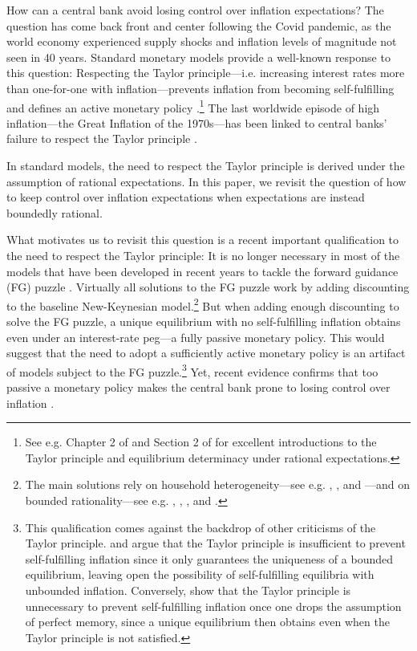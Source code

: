 \documentclass{article}
\begin{document}
How can a central bank avoid losing control over inflation expectations? The question has come back front and center following the Covid pandemic, as the world economy experienced supply shocks and inflation levels of magnitude not seen in 40 years. Standard monetary models provide a well-known response to this question: Respecting the Taylor principle---i.e. increasing interest rates more than one-for-one with inflation---prevents inflation from becoming self-fulfilling and defines an active monetary policy \citep[e.g.][]{Woodford2001}.\footnote{See e.g. Chapter 2 of \cite{Woodford} and Section 2 of \cite{CastilloMartinezReis2022} for excellent introductions to the Taylor principle and equilibrium determinacy under rational expectations.} The last worldwide episode of high inflation---the Great Inflation of the 1970s---has been linked to central banks' failure to respect the Taylor principle \citep{Taylor1999,CGG2000}.

In standard models, the need to respect the Taylor principle is derived under the assumption of rational expectations. In this paper, we revisit the question of how to keep control over inflation expectations when expectations are instead boundedly rational.

What motivates us to revisit this question is a recent important qualification to the need to respect the Taylor principle: It is no longer necessary in most of the models that have been developed in recent years to tackle the forward guidance (FG) puzzle \citep{DNGP2012,CFP2015}. Virtually all solutions to the FG puzzle work by adding discounting to the baseline New-Keynesian model.\footnote{The main solutions rely on household heterogeneity---see e.g. \cite{MKNS2016}, \cite{Bilbiie2020,Bilbiie2021}, \cite{Werning2015} and \cite{AcharyaDogra2020}---and on bounded rationality---see e.g. \cite{Woodford2019}, \cite{FarhiWerning2019}, \cite{Gabaix2020}, \cite{AngeletosLian2018} and \cite{FPHIFLAP}.} But when adding enough discounting to solve the FG puzzle, a unique equilibrium with no self-fulfilling inflation obtains even under an interest-rate peg---a fully passive monetary policy. This would suggest that the need to adopt a sufficiently active monetary policy is an artifact of models subject to the FG puzzle.\footnote{This qualification comes against the backdrop of other criticisms of the Taylor principle. \cite{Cochrane2011} and \cite{Atkesonetal2010} argue that the Taylor principle is insufficient to prevent self-fulfilling inflation since it only guarantees the uniqueness of a bounded equilibrium, leaving open the possibility of self-fulfilling equilibria with unbounded inflation. Conversely, \cite{AngeletosLian2022} show that the Taylor principle is unnecessary to prevent self-fulfilling inflation once one drops the assumption of perfect memory, since a unique equilibrium then obtains even when the Taylor principle is not satisfied.} Yet, recent evidence confirms that too passive a monetary policy makes the central bank prone to losing control over inflation \citep[for instance the recent unfortunate experience of Turkey---see ][]{Gurkaynaketal}.
\end{document}
